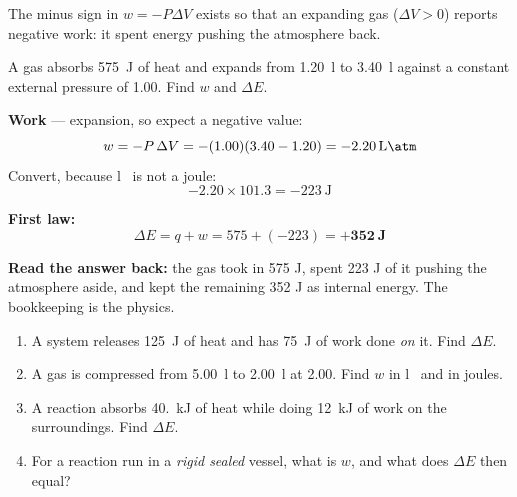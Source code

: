 \documentclass{apchem-worksheet}
\begin{document}
The minus sign in $w = -P\Delta V$ exists so that an expanding gas
($\Delta V > 0$) reports negative work: it spent energy pushing the
atmosphere back.

\begin{workedexample}
A gas absorbs \SI{575}{\joule} of heat and expands from
\SI{1.20}{\litre} to \SI{3.40}{\litre} against a constant external
pressure of \SI{1.00}{\atm}. Find $w$ and $\Delta E$.

\textbf{Work} --- expansion, so expect a negative value:
\[ w = -P\,\Delta V = -(1.00)(3.40 - 1.20) = \SI{-2.20}{\litre\atm} \]
Convert, because \si{\litre\atm} is not a joule:
\[ -2.20 \times 101.3 = \SI{-223}{\joule} \]

\textbf{First law:}
\[ \Delta E = q + w = 575 + (-223) = \mathbf{+352~J} \]

\textbf{Read the answer back:} the gas took in 575 J, spent 223 J of it
pushing the atmosphere aside, and kept the remaining 352 J as internal
energy. The bookkeeping is the physics.
\end{workedexample}

\begin{yourturn}
\begin{enumerate}[leftmargin=*,itemsep=0.5em]
  \item A system releases \SI{125}{\joule} of heat and has
        \SI{75}{\joule} of work done \emph{on} it. Find $\Delta E$.
        \workspace[1.4cm]
  \item A gas is compressed from \SI{5.00}{\litre} to
        \SI{2.00}{\litre} at \SI{2.00}{\atm}. Find $w$ in
        \si{\litre\atm} and in joules. \workspace[1.8cm]
  \item A reaction absorbs \SI{40.}{\kilo\joule} of heat while doing
        \SI{12}{\kilo\joule} of work on the surroundings. Find
        $\Delta E$. \workspace[1.6cm]
  \item For a reaction run in a \emph{rigid sealed} vessel, what is $w$,
        and what does $\Delta E$ then equal? \workspace[1.4cm]
\end{enumerate}
\end{yourturn}
\end{document}
